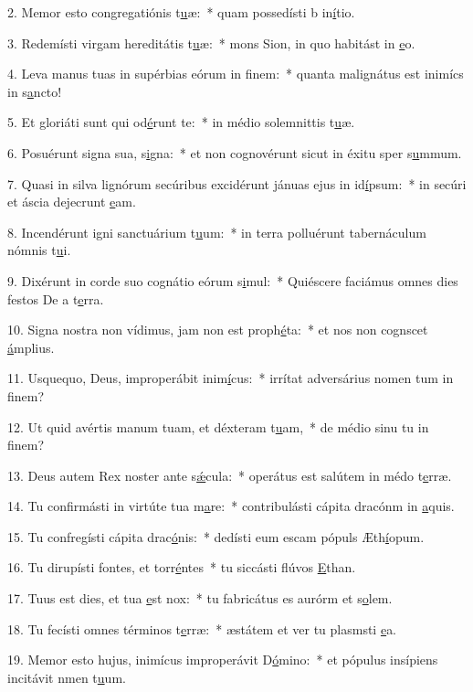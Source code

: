 2. Memor esto congregatiónis t\uline{u}æ:~* quam possedísti b in\uline{í}tio.\par 
3. Redemísti virgam hereditátis t\uline{u}æ:~* mons Sion, in quo habitást in \uline{e}o.\par 
4. Leva manus tuas in supérbias eórum in f\uline{i}nem:~* quanta malignátus est inimícs in s\uline{a}ncto!\par 
5. Et gloriáti sunt qui od\uline{é}runt te:~* in médio solemnittis t\uline{u}æ.\par 
6. Posuérunt signa sua, s\uline{i}gna:~* et non cognovérunt sicut in éxitu sper s\uline{u}mmum.\par 
7. Quasi in silva lignórum secúribus excidérunt jánuas ejus in id\uline{í}psum:~* in secúri et áscia dejecrunt \uline{e}am.\par 
8. Incendérunt igni sanctuárium t\uline{u}um:~* in terra polluérunt tabernáculum nómnis t\uline{u}i.\par 
9. Dixérunt in corde suo cognátio eórum s\uline{i}mul:~* Quiéscere faciámus omnes dies festos De a t\uline{e}rra.\par 
10. Signa nostra non vídimus, jam non est proph\uline{é}ta:~* et nos non cognscet \uline{á}mplius.\par 
11. Usquequo, Deus, improperábit inim\uline{í}cus:~* irrítat adversárius nomen tum in f\uline{i}nem?\par 
12. Ut quid avértis manum tuam, et déxteram t\uline{u}am,~* de médio sinu tu in f\uline{i}nem?\par 
13. Deus autem Rex noster ante s\uline{ǽ}cula:~* operátus est salútem in médo t\uline{e}rræ.\par 
14. Tu confirmásti in virtúte tua m\uline{a}re:~* contribulásti cápita dracónm in \uline{a}quis.\par 
15. Tu confregísti cápita drac\uline{ó}nis:~* dedísti eum escam pópuls Æth\uline{í}opum.\par 
16. Tu dirupísti fontes, et torr\uline{é}ntes~* tu siccásti flúvos \uline{E}than.\par 
17. Tuus est dies, et tua \uline{e}st nox:~* tu fabricátus es aurórm et s\uline{o}lem.\par 
18. Tu fecísti omnes términos t\uline{e}rræ:~* æstátem et ver tu plasmsti \uline{e}a.\par 
19. Memor esto hujus, inimícus improperávit D\uline{ó}mino:~* et pópulus insípiens incitávit nmen t\uline{u}um.\par 
